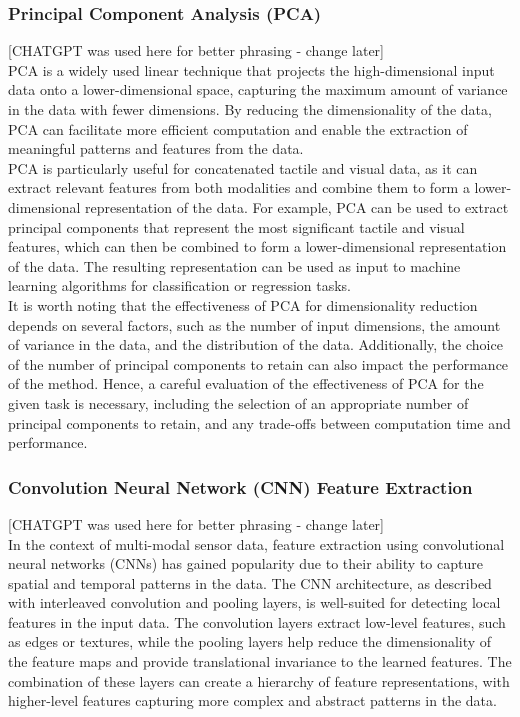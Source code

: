\documentclass[11pt, a4paper]{report}
\begin{document}
\subsubsection{Principal Component Analysis (PCA)}
\label{sec:4.4.2.1}
{\color{red} [CHATGPT was used here for better phrasing - change later]}\\
PCA is a widely used linear technique that projects the high-dimensional input data onto a lower-dimensional space, capturing the maximum amount of variance in the data with fewer dimensions. By reducing the dimensionality of the data, PCA can facilitate more efficient computation and enable the extraction of meaningful patterns and features from the data.\\

PCA is particularly useful for concatenated tactile and visual data, as it can extract relevant features from both modalities and combine them to form a lower-dimensional representation of the data. For example, PCA can be used to extract principal components that represent the most significant tactile and visual features, which can then be combined to form a lower-dimensional representation of the data. The resulting representation can be used as input to machine learning algorithms for classification or regression tasks.\\

It is worth noting that the effectiveness of PCA for dimensionality reduction depends on several factors, such as the number of input dimensions, the amount of variance in the data, and the distribution of the data. Additionally, the choice of the number of principal components to retain can also impact the performance of the method. Hence, a careful evaluation of the effectiveness of PCA for the given task is necessary, including the selection of an appropriate number of principal components to retain, and any trade-offs between computation time and performance.


\subsubsection{Convolution Neural Network (CNN) Feature Extraction}
\label{sec:4.4.2.2}
{\color{red} [CHATGPT was used here for better phrasing - change later]}\\
In the context of multi-modal sensor data, feature extraction using convolutional neural networks (CNNs) has gained popularity due to their ability to capture spatial and temporal patterns in the data. The CNN architecture, as described with interleaved convolution and pooling layers, is well-suited for detecting local features in the input data. The convolution layers extract low-level features, such as edges or textures, while the pooling layers help reduce the dimensionality of the feature maps and provide translational invariance to the learned features. The combination of these layers can create a hierarchy of feature representations, with higher-level features capturing more complex and abstract patterns in the data.
\end{document}
